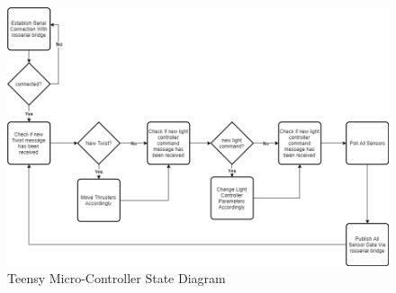 \documentclass{scrreprt}
\begin{document}
\begin{figure}[!ht]
    \centering
    \includegraphics[scale=0.50]{microcontrollerStateDiagram.png}
    \caption{Teensy Micro-Controller State Diagram}
    \label{fig:Teensy Micro-Controller State Diagram}
\end{figure}
\FloatBarrier
\end{document}
